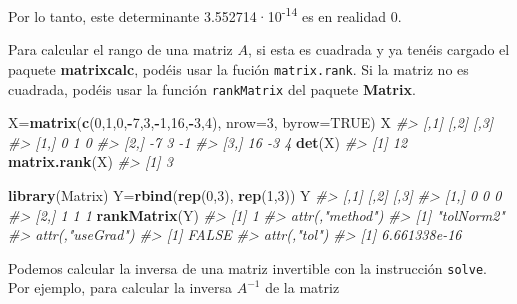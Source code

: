 \documentclass[
]{book}
\newenvironment{Shaded}{\begin{snugshade}}{\end{snugshade}}
\newcommand{\CommentTok}[1]{\textcolor[rgb]{0.56,0.35,0.01}{\textit{#1}}}
\newcommand{\DataTypeTok}[1]{\textcolor[rgb]{0.13,0.29,0.53}{#1}}
\newcommand{\DecValTok}[1]{\textcolor[rgb]{0.00,0.00,0.81}{#1}}
\newcommand{\KeywordTok}[1]{\textcolor[rgb]{0.13,0.29,0.53}{\textbf{#1}}}
\newcommand{\NormalTok}[1]{#1}
\newcommand{\OperatorTok}[1]{\textcolor[rgb]{0.81,0.36,0.00}{\textbf{#1}}}
\newcommand{\OtherTok}[1]{\textcolor[rgb]{0.56,0.35,0.01}{#1}}
\theoremstyle{definition}
\theoremstyle{definition}
\theoremstyle{definition}
\theoremstyle{remark}
\begin{document}
Por lo tanto, este determinante 3.552714·10\textsuperscript{-14} es en realidad 0.

Para calcular el rango de una matriz \(A\), si esta es cuadrada y ya tenéis cargado el paquete \textbf{matrixcalc}, podéis usar la fución \texttt{matrix.rank}. Si la matriz no es cuadrada, podéis usar la función \texttt{rankMatrix} del paquete \textbf{Matrix}.

\begin{Shaded}
\begin{Highlighting}[]
\NormalTok{X=}\KeywordTok{matrix}\NormalTok{(}\KeywordTok{c}\NormalTok{(}\DecValTok{0}\NormalTok{,}\DecValTok{1}\NormalTok{,}\DecValTok{0}\NormalTok{,}\OperatorTok{{-}}\DecValTok{7}\NormalTok{,}\DecValTok{3}\NormalTok{,}\OperatorTok{{-}}\DecValTok{1}\NormalTok{,}\DecValTok{16}\NormalTok{,}\OperatorTok{{-}}\DecValTok{3}\NormalTok{,}\DecValTok{4}\NormalTok{), }\DataTypeTok{nrow=}\DecValTok{3}\NormalTok{, }\DataTypeTok{byrow=}\OtherTok{TRUE}\NormalTok{)}
\NormalTok{X}
\CommentTok{\#\textgreater{}      [,1] [,2] [,3]}
\CommentTok{\#\textgreater{} [1,]    0    1    0}
\CommentTok{\#\textgreater{} [2,]   {-}7    3   {-}1}
\CommentTok{\#\textgreater{} [3,]   16   {-}3    4}
\KeywordTok{det}\NormalTok{(X)}
\CommentTok{\#\textgreater{} [1] 12}
\KeywordTok{matrix.rank}\NormalTok{(X)}
\CommentTok{\#\textgreater{} [1] 3}
\end{Highlighting}
\end{Shaded}

\begin{Shaded}
\begin{Highlighting}[]
\KeywordTok{library}\NormalTok{(Matrix)}
\NormalTok{Y=}\KeywordTok{rbind}\NormalTok{(}\KeywordTok{rep}\NormalTok{(}\DecValTok{0}\NormalTok{,}\DecValTok{3}\NormalTok{), }\KeywordTok{rep}\NormalTok{(}\DecValTok{1}\NormalTok{,}\DecValTok{3}\NormalTok{))}
\NormalTok{Y}
\CommentTok{\#\textgreater{}      [,1] [,2] [,3]}
\CommentTok{\#\textgreater{} [1,]    0    0    0}
\CommentTok{\#\textgreater{} [2,]    1    1    1}
\KeywordTok{rankMatrix}\NormalTok{(Y)}
\CommentTok{\#\textgreater{} [1] 1}
\CommentTok{\#\textgreater{} attr(,"method")}
\CommentTok{\#\textgreater{} [1] "tolNorm2"}
\CommentTok{\#\textgreater{} attr(,"useGrad")}
\CommentTok{\#\textgreater{} [1] FALSE}
\CommentTok{\#\textgreater{} attr(,"tol")}
\CommentTok{\#\textgreater{} [1] 6.661338e{-}16}
\end{Highlighting}
\end{Shaded}

Podemos calcular la inversa de una matriz invertible con la instrucción \texttt{solve}. Por ejemplo, para calcular la inversa \(A^{-1}\) de la matriz
\end{document}
